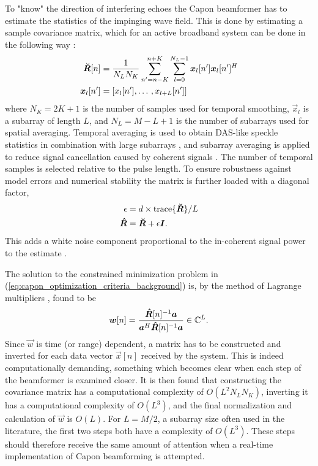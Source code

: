 To "know" the direction of interfering echoes the Capon beamformer has to estimate the statistics of the impinging wave field. This is done by estimating a sample covariance matrix, which for an active broadband system can be done in the following way \cite{Synnevag2009}:
\begin{align}
\boldsymbol{\breve{R}}[n] &= \frac{1}{N_LN_K}\sum_{n'=n-K}^{n+K} \sum_{l=0}^{N_L-1} \boldsymbol{x}_l[n']\boldsymbol{x}_l[n']^H\\
\boldsymbol{x}_l[n'] &= [x_l[n'], \dotso, x_{l+L}[n']]
\end{align}
where $N_K = 2K + 1$  is the number of samples used for temporal smoothing, $\vec{x}_l$ is a subarray of length $L$, and $N_L = M-L+1$ is the number of subarrays used for spatial averaging.  Temporal averaging is used to obtain DAS-like speckle statistics in combination with large subarrays \cite{Synnevag2007a}, and subarray averaging is applied to reduce signal cancellation caused by coherent signals \cite{Reddy1987}. The number of temporal samples is selected relative to the pulse length. To ensure robustness against model errors and numerical stability the matrix is further loaded with a diagonal factor, 
\begin{align}
\epsilon &= d\times\text{trace}\{\boldsymbol{\breve{R}}\}/L\\
\boldsymbol{\hat{R}} &= \boldsymbol{\breve{R}} + \epsilon\boldsymbol{I}.
\end{align} 
This adds a white noise component proportional to the in-coherent signal power to the estimate \cite{Featherstone1997b}.

The solution to the constrained minimization problem in (\ref{eq:capon_optimization_criteria_background}) is, by the method of Lagrange multipliers \cite{VanTrees2003}, found to be
\begin{align}\label{eq:capon_weights}
\boldsymbol{w}[n] = \frac{\boldsymbol{\hat{R}}[n]^{-1}\boldsymbol{a}}{\boldsymbol{a}^H\boldsymbol{\hat{R}}[n]^{-1}\boldsymbol{a}} \in \mathbb{C}^L.
\end{align}
Since $\vec{w}$ is time (or range) dependent, a matrix has to be constructed and inverted for each data vector $\vec{x}[n]$ received by the system. This is indeed computationally demanding, something which becomes clear when each step of the beamformer is examined closer. It is then found that constructing the covariance matrix has a computational complexity of $O(L^2N_LN_K)$, inverting it has a computational complexity of $O(L^3)$, and the final normalization and calculation of $\vec{w}$ is $O(L)$. For $L=M/2$, a subarray size often used in the literature, the first two steps both have a complexity of $O(L^3)$. These steps should therefore receive the same amount of attention when a real-time implementation of Capon beamforming is attempted.

